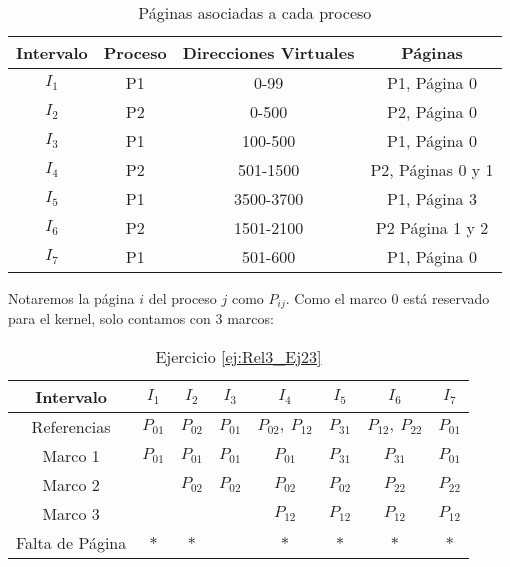 \begin{ejercicio}
\begin{enumerate}
        \begin{table}[H]
            \centering
            \begin{tabular}{|c|c|c|c|}
                \hline
                Intervalo & Proceso & Direcciones Virtuales & Páginas \\
                \hline
                $I_1$& P1 & 0-99 & P1, Página 0 \\
                $I_2$&P2 & 0-500 & P2, Página 0\\
                $I_3$&P1 & 100-500 & P1, Página 0\\
                $I_4$&P2 & 501-1500 & P2, Páginas 0 y 1\\
                $I_5$&P1 & 3500-3700 & P1, Página 3\\
                $I_6$&P2 & 1501-2100 & P2 Página 1 y 2 \\
                $I_7$&P1 & 501-600 & P1, Página 0\\
                \hline
            \end{tabular}
            \caption{Páginas asociadas a cada proceso}
        \end{table}

        Notaremos la página $i$ del proceso $j$ como $P_{ij}$. Como el
        marco 0 está reservado para el kernel, solo contamos con 3 marcos:
        \begin{table}[H]
            \centering
            \begin{tabular}{|c|c|c|c|c|c|c|c|}
            Intervalo       & $I_1$    & $I_2$    & $I_3$    & $I_4$            & $I_5$    & $I_6$            & $I_7$    \\ \hline 
            Referencias     & $P_{01}$ & $P_{02}$ & $P_{01}$ & $P_{02},~P_{12}$ & $P_{31}$ & $P_{12},~P_{22}$ & $P_{01}$ \\ \hline \hline
            Marco 1         & $P_{01}$ & $P_{01}$ & $P_{01}$ & $P_{01}$         & $P_{31}$ & $P_{31}$         & $P_{01}$ \\ \hline
            Marco 2         &          & $P_{02}$ & $P_{02}$ & $P_{02}$         & $P_{02}$ & $P_{22}$         & $P_{22}$ \\ \hline
            Marco 3         &          &          &          & $P_{12}$         & $P_{12}$ & $P_{12}$         & $P_{12}$ \\ \hline \hline
            Falta de Página & $\ast$        & $\ast$        &          & $\ast$                & $\ast$        & $\ast$                & $\ast$
            \end{tabular}
            \caption{Ejercicio \ref{ej:Rel3_Ej23}}
        \end{table}
    \end{enumerate}
\end{ejercicio}


